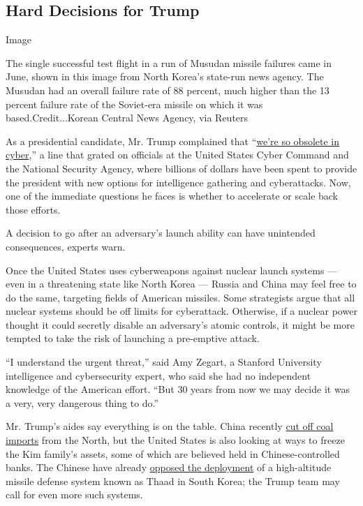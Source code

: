 \hypertarget{hard-decisions-for-trump}{%
\subsection{Hard Decisions for Trump}\label{hard-decisions-for-trump}}

Image

The single successful test flight in a run of Musudan missile failures
came in June, shown in this image from North Korea's state-run news
agency. The Musudan had an overall failure rate of 88 percent, much
higher than the 13 percent failure rate of the Soviet-era missile on
which it was based.Credit...Korean Central News Agency, via Reuters

As a presidential candidate, Mr. Trump complained that
``\href{https://www.nytimes3xbfgragh.onion/2016/03/27/us/politics/donald-trump-transcript.html?_r=0}{we're
so obsolete in cyber},'' a line that grated on officials at the United
States Cyber Command and the National Security Agency, where billions of
dollars have been spent to provide the president with new options for
intelligence gathering and cyberattacks. Now, one of the immediate
questions he faces is whether to accelerate or scale back those efforts.

A decision to go after an adversary's launch ability can have unintended
consequences, experts warn.

Once the United States uses cyberweapons against nuclear launch systems
--- even in a threatening state like North Korea --- Russia and China
may feel free to do the same, targeting fields of American missiles.
Some strategists argue that all nuclear systems should be off limits for
cyberattack. Otherwise, if a nuclear power thought it could secretly
disable an adversary's atomic controls, it might be more tempted to take
the risk of launching a pre-emptive attack.

``I understand the urgent threat,'' said Amy Zegart, a Stanford
University intelligence and cybersecurity expert, who said she had no
independent knowledge of the American effort. ``But 30 years from now we
may decide it was a very, very dangerous thing to do.''

Mr. Trump's aides say everything is on the table. China recently
\href{https://www.nytimes3xbfgragh.onion/2017/02/24/world/asia/china-north-korea-relations-kim-jong-un.html}{cut
off coal imports} from the North, but the United States is also looking
at ways to freeze the Kim family's assets, some of which are believed
held in Chinese-controlled banks. The Chinese have already
\href{https://www.nytimes3xbfgragh.onion/2016/07/08/world/asia/south-korea-and-us-agree-to-deploy-missile-defense-system.html}{opposed
the deployment} of a high-altitude missile defense system known as Thaad
in South Korea; the Trump team may call for even more such systems.

